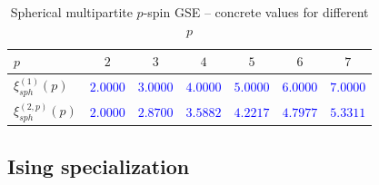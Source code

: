 \documentclass[10pt]{article}
\newcommand{\bl}[1]{\textcolor{blue}{#1}}
\begin{document}
\begin{table}[h]
\caption{Spherical multipartite $p$-spin  GSE -- concrete values  for different $p$ }\vspace{.1in}
\centering
\def\arraystretch{1.2}
\begin{tabular}{||l||c||c||c||c||c||c|| }\hline\hline
 \hspace{-0in}$p$                                             & $2$    & $3$ & $4$ &  $5$ & $6$ &  $7$   \\ \hline\hline
$\xi_{sph}^{(1)} (p )$                                         &  \bl{$\mathbf{2.0000}$} &  \bl{$\mathbf{3.0000}$} &  \bl{$\mathbf{4.0000}$} & \bl{$\mathbf{5.0000}$}  &  \bl{$\mathbf{6.0000}$} &  \bl{$\mathbf{7.0000}$} \\ \hline\hline
$\xi_{sph}^{(2,p)} (p )$                                         & \bl{$\mathbf{2.0000}$}  & \bl{$\mathbf{2.8700}$}  & \bl{$\mathbf{3.5882}$} &
\bl{$\mathbf{4.2217}$}  & \bl{$\mathbf{4.7977}$} & \bl{$\mathbf{5.3311}$}  \\ \hline\hline
\end{tabular}
\label{tab:tab1}
\end{table}







\subsection{Ising specialization}
\label{sec:ldpising}
\end{document}
